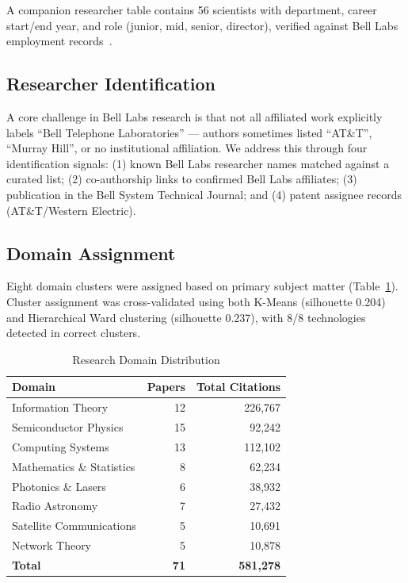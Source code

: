 \documentclass[journal]{IEEEtran}
\begin{document}
A companion researcher table contains 56 scientists with department, career
start/end year, and role (junior, mid, senior, director), verified against
Bell Labs employment records~\cite{Braun1980}.

\subsection{Researcher Identification}
A core challenge in Bell Labs research is that not all affiliated work
explicitly labels ``Bell Telephone Laboratories'' --- authors sometimes listed
``AT\&T'', ``Murray Hill'', or no institutional affiliation. We address this
through four identification signals: (1) known Bell Labs researcher names
matched against a curated list; (2) co-authorship links to confirmed Bell
Labs affiliates; (3) publication in the Bell System Technical Journal; and
(4) patent assignee records (AT\&T/Western Electric).

\subsection{Domain Assignment}
Eight domain clusters were assigned based on primary subject matter
(Table~\ref{tab:domains}). Cluster assignment was cross-validated using
both K-Means (silhouette 0.204) and Hierarchical Ward clustering (silhouette
0.237), with 8/8 technologies detected in correct clusters.

\begin{table}[htbp]
\caption{Research Domain Distribution}
\label{tab:domains}
\centering
\begin{tabular}{lrr}
\toprule
\textbf{Domain} & \textbf{Papers} & \textbf{Total Citations} \\
\midrule
Information Theory       & 12 & 226,767 \\
Semiconductor Physics    & 15 &  92,242 \\
Computing Systems        & 13 & 112,102 \\
Mathematics \& Statistics &  8 &  62,234 \\
Photonics \& Lasers      &  6 &  38,932 \\
Radio Astronomy          &  7 &  27,432 \\
Satellite Communications &  5 &  10,691 \\
Network Theory           &  5 &  10,878 \\
\midrule
\textbf{Total}           & \textbf{71} & \textbf{581,278} \\
\bottomrule
\end{tabular}
\end{table}
\end{document}
